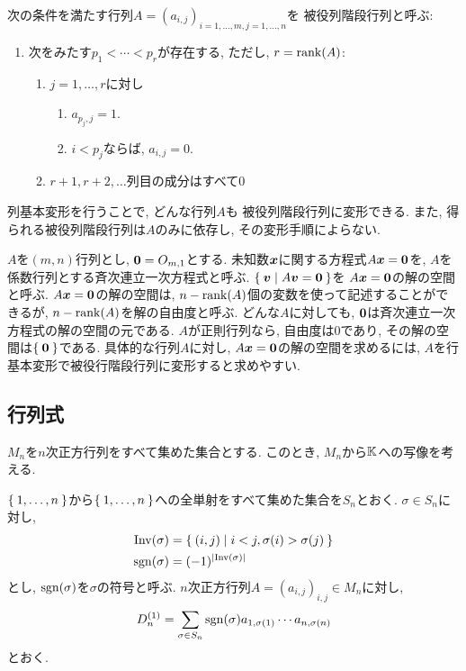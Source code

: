 次の条件を満たす行列$A=(a_{i,j})_{i=1,\ldots,m,j=1,\ldots,n}$を
被役列階段行列と呼ぶ:
\begin{enumerate}
\item 次をみたす$p_1<\cdots <p_r$が存在する, ただし, $r=\operatorname{rank}(A)$:
\begin{enumerate}
\item $j=1,\ldots,r$に対し
\begin{enumerate}
\item $a_{p_j,j}=1$.
\item $i<p_j$ならば, $a_{i,j}=0$.
\end{enumerate}
\item $r+1,r+2,\ldots$列目の成分はすべて$0$
\end{enumerate}
\end{enumerate}
列基本変形を行うことで,
どんな行列$A$も
被役列階段行列に変形できる.
また,
得られる被役列階段行列は$A$のみに依存し,
その変形手順によらない.



$A$を$(m,n)$行列とし,
$\boldsymbol{0}=O_{m,1}$とする.
未知数$\boldsymbol{x}$に関する方程式$A\boldsymbol{x}=\boldsymbol{0}$を,
$A$を係数行列とする斉次連立一次方程式と呼ぶ.
$\Set{\boldsymbol{v}|A\boldsymbol{v}=\boldsymbol{0}}$を
$A\boldsymbol{x}=\boldsymbol{0}$の解の空間と呼ぶ.
$A\boldsymbol{x}=\boldsymbol{0}$の解の空間は,
$n-\operatorname{rank}(A)$個の変数を使って記述することができるが,
$n-\operatorname{rank}(A)$を解の自由度と呼ぶ.
どんな$A$に対しても,
$\boldsymbol{0}$は斉次連立一次方程式の解の空間の元である.
$A$が正則行列なら, 自由度は$0$であり,
その解の空間は$\Set{\boldsymbol{0}}$である.
具体的な行列$A$に対し,
$A\boldsymbol{x}=\boldsymbol{0}$の解の空間を求めるには,
$A$を行基本変形で被役行階段行列に変形すると求めやすい.


\subsection{行列式}
$M_n$を$n$次正方行列をすべて集めた集合とする.
このとき, $M_n$から$\mathbb{K}$への写像を考える.

$\Set{1,\ldots,n}$から$\Set{1,\ldots,n}$への全単射をすべて集めた集合を$S_n$とおく.
$\sigma\in S_n$に対し,
\begin{align*}
\operatorname{Inv}(\sigma)&=\Set{(i,j)|i<j, \sigma(i)>\sigma(j)}\\
\operatorname{sgn}(\sigma)&=(-1)^{\left|\operatorname{Inv}(\sigma)\right|}
\end{align*}
とし, $\operatorname{sgn}(\sigma)$を$\sigma$の符号と呼ぶ.
$n$次正方行列$A=(a_{i,j})_{i,j}\in M_n$に対し,
\begin{align*}
D_n^{(1)}=\sum_{\sigma\in S_n} \operatorname{sgn}(\sigma)a_{1,\sigma(1)}\cdots a_{n,\sigma(n)}
\end{align*}
とおく.

